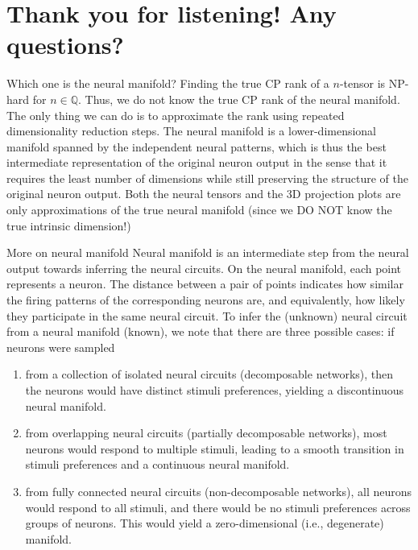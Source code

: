 \documentclass[xcolor={dvipsnames,svgnames}]{beamer}
\begin{document}
\section[Q \& A]{Thank you for listening! Any questions?}
\begin{frame}{Which one is the neural manifold?}
    Finding the true CP rank of a $n$-tensor is NP-hard for $n \in \mathbb{Q}$. Thus, we do not know the true CP rank of the neural manifold. The only thing we can do is to approximate the rank using repeated dimensionality reduction steps. The neural manifold is a lower-dimensional manifold spanned by the independent neural patterns, which is thus the best intermediate representation of the original neuron output in the sense that it requires the least number of dimensions while still preserving the structure of the original neuron output. Both the neural tensors and the 3D projection plots are only approximations of the true neural manifold (since we DO NOT know the true intrinsic dimension!)
\end{frame}
\begin{frame}{More on neural manifold}
    Neural manifold is an intermediate step from the neural output towards inferring the neural circuits. On the neural manifold, each point represents a neuron. The distance between a pair of points indicates how similar the firing patterns of the corresponding neurons are, and equivalently, how likely they participate in the same neural circuit. To infer the (unknown) neural circuit from a neural manifold (known), we note that there are three possible cases: if neurons were sampled 
\begin{enumerate}
    \item from a collection of isolated neural circuits (decomposable networks), then the neurons would have distinct stimuli preferences, yielding a discontinuous neural manifold.
    \item from overlapping neural circuits (partially decomposable networks), most neurons would respond to multiple stimuli, leading to a smooth transition in stimuli preferences and a continuous neural manifold. 
    \item from fully connected neural circuits (non-decomposable networks),  all neurons would respond to all stimuli, and there would be no stimuli preferences across groups of neurons. This would yield a zero-dimensional (i.e., degenerate) manifold.
\end{enumerate}
\end{frame}
\end{document}

